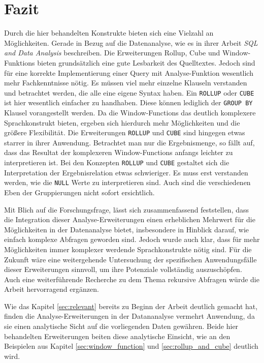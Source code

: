 \chapter{Fazit}
\label{chap:fazit} Durch die hier behandelten Konstrukte bieten sich eine Vielzahl
an Möglichkeiten. Gerade in Bezug auf die Datenanalyse, wie es \citet{FOTACHE2015243}
in ihrer Arbeit \textit{SQL and Data Analysis} beschreiben. Die Erweiterungen
Rollup, Cube und Window-Funktions bieten grundsätzlich eine gute Lesbarkeit des Quelltextes.
Jedoch sind für eine korrekte Implementierung einer Query mit Analyse-Funktion
wesentlich mehr Fachkenntnisse nötig. Es müssen viel mehr einzelne Klauseln verstanden
und betrachtet werden, die alle eine eigene Syntax haben. Ein \texttt{ROLLUP}
oder \texttt{CUBE} ist hier wesentlich einfacher zu handhaben. Diese können
lediglich der \texttt{GROUP BY} Klausel vorangestellt werden. Da die Window-Functions
das deutlich komplexere Sprachkonstrukt bieten, ergeben sich hierdurch
mehr Möglichkeiten und die größere Flexibilität. Die Erweiterungen \texttt{ROLLUP}
und \texttt{CUBE} sind hingegen etwas starrer in ihrer Anwendung. Betrachtet man nur die
Ergebnismenge, so fällt auf, dass das Resultat der komplexeren Window-Functions anfangs leichter
zu interpretieren ist. Bei den Konzepten \texttt{ROLLUP} und \texttt{CUBE} gestaltet sich die
Interpretation der Ergebnisrelation etwas schwieriger. Es muss erst verstanden werden,
wie die \texttt{NULL} Werte zu interpretieren sind. Auch sind die verschiedenen
Eben der Gruppierungen nicht sofort ersichtlich.

Mit Blich auf die Forschungsfrage, lässt sich zusammenfassend feststellen, dass
die Integration dieser Analyse-Erweiterungen einen erheblichen Mehrwert für die
Möglichkeiten in der Datenanalyse bietet, insbesondere in Hinblick darauf, wie
einfach komplexe Abfragen geworden sind. Jedoch wurde auch klar, dass für mehr
Möglichkeiten immer komplexer werdende Sprachkonstrukte nötig sind. Für die Zukunft
wäre eine weitergehende Untersuchung der spezifischen Anwendungsfälle dieser Erweiterungen
sinnvoll, um ihre Potenziale vollständig auszuschöpfen. Auch eine weiterführende
Recherche zu dem Thema rekursive Abfragen würde die Arbeit hervorragend ergänzen.




Wie das Kapitel
\ref{sec:relevant} bereits zu Beginn der Arbeit deutlich gemacht hat, finden die
Analyse-Erweiterungen in der Datananalyse vermehrt Anwendung, da sie einen
analytische Sicht auf die vorliegenden Daten gewähren. Beide hier behandelten Erweiterungen
beiten diese analytische Einsicht, wie an den Beispielen aus Kapitel
\ref{sec:window_function} und \ref{sec:rollup_and_cube} deutlich wird.